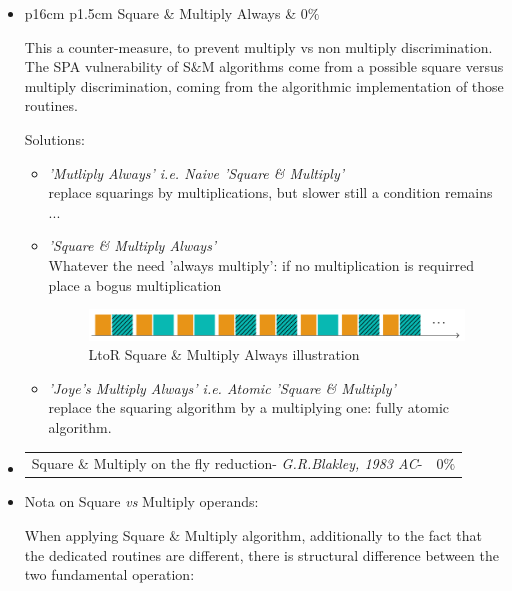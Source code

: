 \begin{itemize}
\item  \begin{tabularx}{\linewidth}{ p{16cm} p{1.5cm}}
			Square \& Multiply Always  & $0\%$ \\ 
		\end{tabularx}	
		\label{Square_Multiply_Always}
		\noindent
		This a counter-measure, to prevent multiply vs non multiply discrimination.\\
		The SPA vulnerability of S$\&$M algorithms come from a possible square versus 
		multiply discrimination, coming from the algorithmic implementation of those routines.

			Solutions:
		\begin{itemize}
			\item \textit{'Mutliply Always' i.e. Naive 'Square \& Multiply'} \\
			replace squarings by multiplications, but slower still a condition remains ...
			\item \textit{'Square \& Multiply Always'} \\
			Whatever the need 'always multiply': if no multiplication is requirred place a bogus multiplication
			\begin{figure}[h]
				\begin{center}
	        	\includegraphics[scale=0.33]{images/SMA.png}
				\caption{LtoR Square \& Multiply Always illustration}
				\end{center}
			\end{figure}
			\item \textit{'Joye's Multiply Always' i.e. Atomic 'Square \& Multiply'} \\
			replace the squaring algorithm by a multiplying one: fully atomic algorithm.
		\end{itemize}

\item 	\begin{tabularx}{\linewidth}{ p{16cm} p{1.5cm}} 
		Square \& Multiply on the fly reduction-
		\textit{G.R.Blakley, 1983 AC}-  & $0\%$ \\
		\end{tabularx}	

\item 	Nota on Square \textit{vs} Multiply operands:

		When applying Square \& Multiply algorithm, additionally to the fact that
		the dedicated routines are different, there is structural difference between the two 
		fundamental operation:


\end{itemize}
